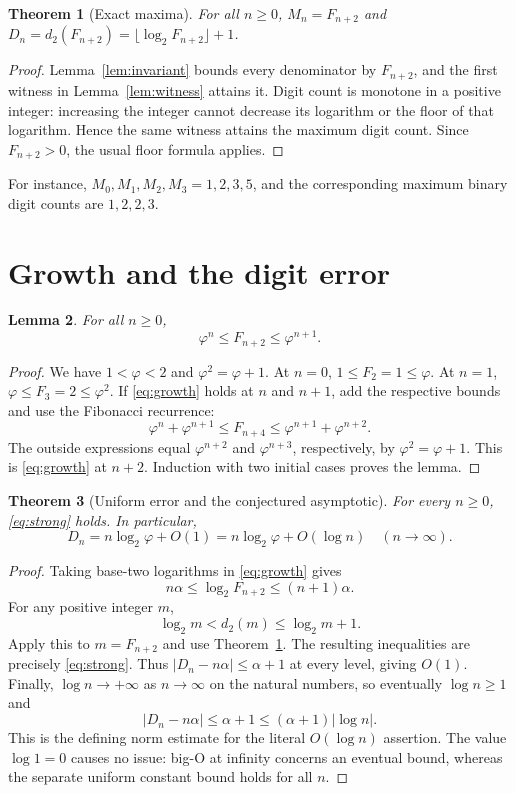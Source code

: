 \documentclass[11pt]{article}
\newtheorem{theorem}{Theorem}
\newtheorem{lemma}[theorem]{Lemma}
\newcommand{\ph}{\varphi}
\begin{document}
\begin{theorem}[Exact maxima]\label{thm:exact}
For all $n\ge0$, $M_n=F_{n+2}$ and
$D_n=d_2(F_{n+2})=\lfloor\log_2 F_{n+2}\rfloor+1$.
\end{theorem}
\begin{proof}
Lemma~\ref{lem:invariant} bounds every denominator by $F_{n+2}$, and the
first witness in Lemma~\ref{lem:witness} attains it. Digit count is monotone
in a positive integer: increasing the integer cannot decrease its
logarithm or the floor of that logarithm. Hence the same witness attains
the maximum digit count. Since $F_{n+2}>0$, the usual floor formula applies.
\end{proof}
For instance, $M_0,M_1,M_2,M_3=1,2,3,5$, and the corresponding maximum
binary digit counts are $1,2,2,3$.

\section{Growth and the digit error}
\begin{lemma}\label{lem:growth}
For all $n\ge0$,
\begin{equation}\label{eq:growth}
 \ph^n\le F_{n+2}\le\ph^{n+1}.
\end{equation}
\end{lemma}
\begin{proof}
We have $1<\ph<2$ and $\ph^2=\ph+1$. At $n=0$,
$1\le F_2=1\le\ph$. At $n=1$, $\ph\le F_3=2\le\ph^2$.
If \eqref{eq:growth} holds at $n$ and $n+1$, add the respective bounds
and use the Fibonacci recurrence:
\[
 \ph^n+\ph^{n+1}\le F_{n+4}\le\ph^{n+1}+\ph^{n+2}.
\]
The outside expressions equal $\ph^{n+2}$ and $\ph^{n+3}$, respectively,
by $\ph^2=\ph+1$. This is \eqref{eq:growth} at $n+2$.
Induction with two initial cases proves the lemma.
\end{proof}

\begin{theorem}[Uniform error and the conjectured asymptotic]\label{thm:asymptotic}
For every $n\ge0$, \eqref{eq:strong} holds. In particular,
\[
 D_n=n\log_2\ph+O(1)=n\log_2\ph+O(\log n)\quad(n\longrightarrow\infty).
\]
\end{theorem}
\begin{proof}
Taking base-two logarithms in \eqref{eq:growth} gives
\[
 n\alpha\le\log_2 F_{n+2}\le(n+1)\alpha.
\]
For any positive integer $m$,
\[
 \log_2 m<d_2(m)\le\log_2 m+1.
\]
Apply this to $m=F_{n+2}$ and use Theorem~\ref{thm:exact}. The resulting
inequalities are precisely \eqref{eq:strong}. Thus
$|D_n-n\alpha|\le\alpha+1$ at every level, giving $O(1)$.
Finally, $\log n\to+\infty$ as $n\to\infty$ on the natural numbers,
so eventually $\log n\ge1$ and
\[
 |D_n-n\alpha|\le\alpha+1\le(\alpha+1)|\log n|.
\]
This is the defining norm estimate for the literal $O(\log n)$ assertion.
The value $\log 1=0$ causes no issue: big-O at infinity concerns an eventual
bound, whereas the separate uniform constant bound holds for all $n$.
\end{proof}
\end{document}
